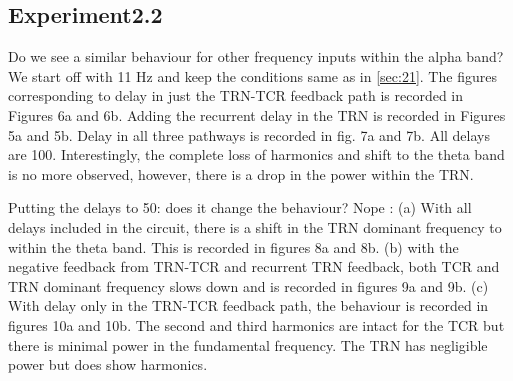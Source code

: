 \documentclass[11pt,a4paper]{article}
\begin{document}
\subsection{Experiment2.2}
\label{sec:22}
Do we see a similar behaviour for other frequency inputs within the alpha band?
We start off with 11 Hz and keep the conditions same as in \ref{sec:21}. The figures corresponding to delay in just the TRN-TCR feedback path is recorded in Figures 6a and 6b. Adding the recurrent delay in the TRN is recorded in Figures 5a and 5b. Delay in all three pathways is recorded in fig. 7a and 7b. 
All delays are 	100. 
Interestingly, the complete loss of harmonics and shift to the theta band is no more observed, however, there is a drop in the power within the TRN.

Putting the delays to 50: does it change the behaviour?
Nope :
(a) With all delays included in the circuit, there is a shift in the TRN dominant frequency to within the theta band. This is recorded in figures 8a and 8b.
(b) with the negative feedback from TRN-TCR and recurrent TRN feedback, both TCR and TRN dominant frequency slows down and is recorded in figures 9a and 9b.
(c) With delay only in the TRN-TCR feedback path, the behaviour is recorded in figures 10a and 10b. The second and third harmonics are intact for the TCR but there is minimal power in the fundamental frequency.
The TRN has negligible power but does show harmonics.
\end{document}
